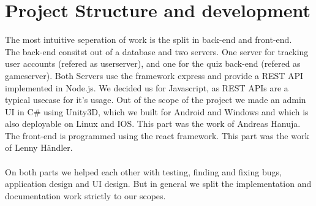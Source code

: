 \chapter{Project Structure and development}
The most intuitive seperation of work is the split in back-end and front-end.\\

The back-end consitst out of a database and two servers. One server for tracking user accounts (refered as userserver), and one for the quiz back-end (refered as gameserver).
Both Servers use the framework express and provide a REST API implemented in Node.js. We decided us for Javascript, as REST APIs are a typical usecase for it's usage.
Out of the scope of the project we made an admin UI in C\# using Unity3D, which we built for Android and Windows and which is also deployable on Linux and IOS. This part was the work of Andreas Hanuja.\\

The front-end is programmed using the react framework. This part was the work of Lenny Händler.\\\\

On both parts we helped each other with testing, finding and fixing bugs, application design and UI design. But in general we split the implementation and documentation work strictly to our scopes.

